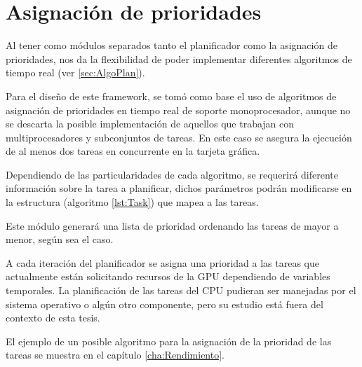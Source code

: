 \section{Asignación de prioridades} \label{secc:asigPrioridad}

Al tener como módulos separados tanto el planificador como la asignación de prioridades, nos da la flexibilidad de poder implementar diferentes algoritmos de tiempo real (ver \ref{sec:AlgoPlan}).
\newline

Para el diseño de este framework, se tomó como base el uso de algoritmos de asignación de prioridades en tiempo real de soporte monoprocesador, aunque no se descarta la posible implementación de aquellos que trabajan con multiprocesadores y subconjuntos de tareas. En este caso se asegura la ejecución de al menos dos tareas en concurrente en la tarjeta gráfica.
\newline

Dependiendo de las particularidades de cada algoritmo, se requerirá diferente información sobre la tarea a planificar, dichos parámetros podrán modificarse en la estructura (algoritmo \ref{lst:Task}) que mapea a las tareas.
\newline

Este módulo generará una lista de prioridad ordenando las tareas de mayor a menor, según sea el caso.
\newline

A cada iteración del planificador se asigna una prioridad a las tareas que actualmente están solicitando recursos de la GPU dependiendo de variables temporales. La planificación de las tareas del CPU pudieran ser manejadas por el sistema operativo o algún otro componente, pero su estudio está fuera del contexto de esta tesis.
\newline

El ejemplo de un posible algoritmo para la asignación de la prioridad de las tareas se muestra en el capítulo \ref{cha:Rendimiento}.
